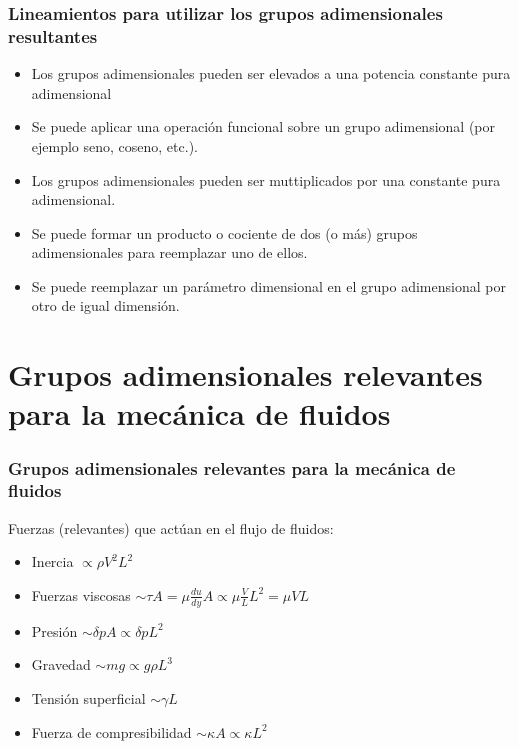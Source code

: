 \documentclass[t]{beamer}
\begin{document}
\begin{frame}
\frametitle{Lineamientos para utilizar los grupos adimensionales resultantes}
\begin{itemize}
\item  Los grupos adimensionales pueden ser elevados a una potencia constante pura adimensional
\item  Se puede aplicar una operación funcional sobre un grupo adimensional (por ejemplo seno, coseno, etc.).
\item  Los grupos adimensionales pueden ser muttiplicados por una constante pura adimensional.
\item  Se puede formar un producto o cociente de dos (o más) grupos adimensionales para reemplazar uno de ellos.
\item  Se puede reemplazar un parámetro dimensional en el grupo adimensional por otro de igual dimensión.
\end{itemize}
\end{frame}
\section{Grupos adimensionales relevantes para la mec\'anica de fluidos}
\begin{frame}
\frametitle{Grupos adimensionales relevantes para la mec\'anica de fluidos}

Fuerzas (relevantes) que act\'uan en el flujo de fluidos:
\vspace{0.2cm}

\begin{itemize}
\item Inercia $\propto \rho V^2 L^2$
\item Fuerzas viscosas $\sim \tau A  = \mu \frac{du}{dy} A  \propto \mu \frac{V}{L}L^2 = \mu VL $
\item Presi\'on $\sim \delta p A \propto \delta p L^2$
\item Gravedad $\sim mg \propto g\rho L^3$
\item Tensi\'on superficial $\sim \gamma L$
 \item Fuerza de compresibilidad $\sim \kappa A  \propto \kappa L^2$

\end{itemize}

\end{frame}
\end{document}
